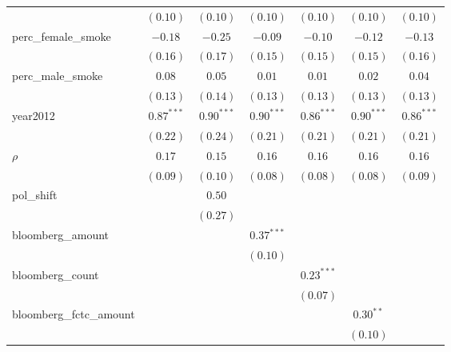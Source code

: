 \begin{table}[!h]
\begin{center}
\begin{tabular}{l c c c c c c }
                        & $(0.10)$     & $(0.10)$     & $(0.10)$     & $(0.10)$     & $(0.10)$     & $(0.10)$     \\
perc\_female\_smoke     & $-0.18$      & $-0.25$      & $-0.09$      & $-0.10$      & $-0.12$      & $-0.13$      \\
                        & $(0.16)$     & $(0.17)$     & $(0.15)$     & $(0.15)$     & $(0.15)$     & $(0.16)$     \\
perc\_male\_smoke       & $0.08$       & $0.05$       & $0.01$       & $0.01$       & $0.02$       & $0.04$       \\
                        & $(0.13)$     & $(0.14)$     & $(0.13)$     & $(0.13)$     & $(0.13)$     & $(0.13)$     \\
year2012                & $0.87^{***}$ & $0.90^{***}$ & $0.90^{***}$ & $0.86^{***}$ & $0.90^{***}$ & $0.86^{***}$ \\
                        & $(0.22)$     & $(0.24)$     & $(0.21)$     & $(0.21)$     & $(0.21)$     & $(0.21)$     \\
$\rho$                  & $0.17$       & $0.15$       & $0.16$       & $0.16$       & $0.16$       & $0.16$       \\
                        & $(0.09)$     & $(0.10)$     & $(0.08)$     & $(0.08)$     & $(0.08)$     & $(0.09)$     \\
pol\_shift              &              & $0.50$       &              &              &              &              \\
                        &              & $(0.27)$     &              &              &              &              \\
bloomberg\_amount       &              &              & $0.37^{***}$ &              &              &              \\
                        &              &              & $(0.10)$     &              &              &              \\
bloomberg\_count        &              &              &              & $0.23^{***}$ &              &              \\
                        &              &              &              & $(0.07)$     &              &              \\
bloomberg\_fctc\_amount &              &              &              &              & $0.30^{**}$  &              \\
                        &              &              &              &              & $(0.10)$     &              \\

\end{tabular}
\end{center}
\end{table}
